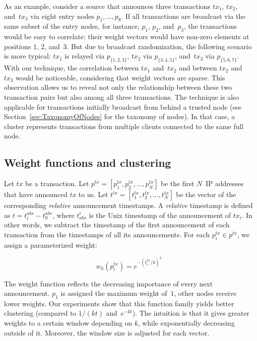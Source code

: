 As an example, consider a source that announces three transactions $tx_1$, $tx_2$, and~$tx_3$ via eight entry nodes $p_1, \dots, p_8$.
If all transactions are broadcast via the same subset of the entry nodes, for instance, $p_1$, $p_2$, and~$p_3$, the transactions would be easy to correlate: their weight vectors would have non-zero elements at positions $1$, $2$, and~$3$.
But due to broadcast randomization, the following scenario is more typical: $tx_1$ is relayed via $p_{\{1,2,3\}}$, $tx_2$ via $p_{\{3,4,5\}}$, and~$tx_3$ via $p_{\{5,6,7\}}$.
With our technique, the correlation between $tx_1$ and~$tx_2$ and between $tx_2$ and~$tx_3$ would be noticeable, considering that weight vectors are sparse.
This observation allows us to reveal not only the relationship between these two transaction pairs but also among all three transactions.
The technique is also applicable for transactions initially broadcast from behind a trusted node (see Section~\ref{sec:TaxonomyOfNodes} for the taxonomy of nodes).
In that case, a cluster represents transactions from multiple clients connected to the same full node.


\subsection{Weight functions and clustering}

Let $tx$ be a transaction.
Let $p^{tx} = [p^{tx}_1, p^{tx}_2, \dots, p^{tx}_N]$ be the first $N$~IP addresses that have announced $tx$ to us.
Let $t^{tx} = [t^{tx}_1, t^{tx}_2, \dots, t^{tx}_N]$ be the vector of the corresponding \textit{relative} announcement timestamps.
A \textit{relative} timestamp is defined as $t = t^{abs}_i - t^{abs}_0$, where $t_{abs}^i$ is the Unix timestamp of the announcement of $tx_i$.
In other words, we subtract the timestamp of the first announcement of each transaction from the timestamps of all its announcements.
For each $p^{tx}_i \in p^{tx}$, we assign a parameterized weight:

\[
w_k(p^{tx}_i) = e^{-(t^{tx}_i/k)^2}
\]

The weight function reflects the decreasing importance of every next announcement.
$p_1$ is assigned the maximum weight of~$1$, other nodes receive lower weights.
Our experiments show that this function family yields better clustering (compared to $1/(kt)$ and~$e^{-kt}$).
The intuition is that it gives greater weights to a certain window depending on $k$, while exponentially decreasing outside of it.
Moreover, the window size is adjusted for each vector.

